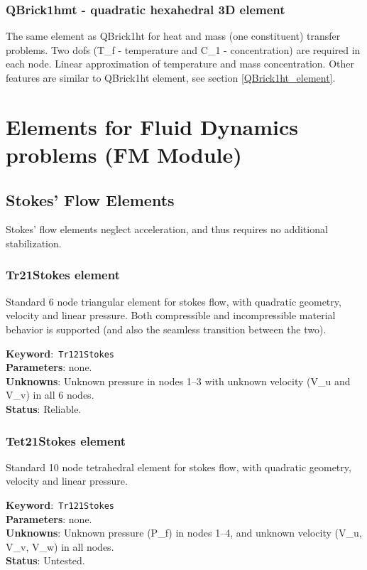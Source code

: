 \documentclass[a4paper]{article}
\newcommand{\descitem}[1]{{\noindent \textbf{#1}}:}
\newcommand{\elemkeyword}[1]{\descitem{Keyword}~\param{#1}} %
\newcommand{\param}[1]{\texttt{#1}} %
\begin{document}
\subsubsection{QBrick1hmt - quadratic hexahedral 3D element}
The same element as QBrick1ht for
heat and mass (one constituent) transfer problems. 
Two dofs (T\_f - temperature and C\_1 - concentration) are required in
each node. Linear approximation of temperature and mass concentration.
Other features are similar to QBrick1ht element, see section \ref{QBrick1ht_element}.


\clearpage
\section{Elements for Fluid Dynamics problems (FM Module)}
\subsection{Stokes' Flow Elements}
Stokes' flow elements neglect acceleration, and thus requires no additional stabilization.

\subsubsection{Tr21Stokes element}
Standard 6 node triangular element for stokes flow, with quadratic geometry, velocity and linear pressure.
Both compressible and incompressible material behavior is supported (and also the seamless transition between the two).

\elemkeyword{Tr121Stokes}\\
\descitem{Parameters} none. \\
\descitem{Unknowns} Unknown pressure in nodes 1--3 with unknown velocity (V\_u and V\_v) in all 6 nodes. \\
\descitem{Status} Reliable.

\subsubsection{Tet21Stokes element}
Standard 10 node tetrahedral element for stokes flow, with quadratic geometry, velocity and linear pressure.

\elemkeyword{Tr121Stokes}\\
\descitem{Parameters} none. \\
\descitem{Unknowns} Unknown pressure (P\_f) in nodes 1--4, and unknown velocity (V\_u, V\_v, V\_w) in all nodes. \\
\descitem{Status} Untested.
\end{document}
